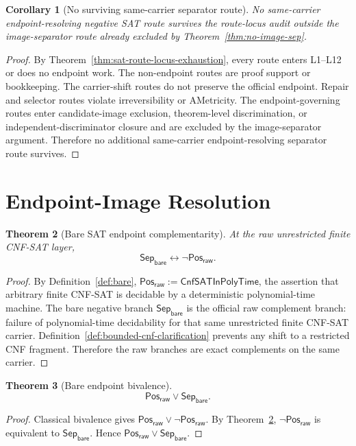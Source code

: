 \documentclass[11pt]{article}
\newtheorem{theorem}{Theorem}[section]
\newtheorem{corollary}[theorem]{Corollary}
\theoremstyle{definition}
\theoremstyle{remark}
\newcommand{\PosRaw}{\mathsf{Pos}_{\mathsf{raw}}}
\newcommand{\SepBare}{\mathsf{Sep}_{\mathsf{bare}}}
\newcommand{\CnfSATP}{\mathsf{CnfSATInPolyTime}}
\begin{document}
\begin{corollary}[No surviving same-carrier separator route]\label{cor:no-surviving-sat-separator-route}
No same-carrier endpoint-resolving negative SAT route survives the route-locus audit outside the image-separator route already excluded by Theorem~\ref{thm:no-image-sep}.
\end{corollary}

\begin{proof}
By Theorem~\ref{thm:sat-route-locus-exhaustion}, every route enters L1--L12 or does no endpoint work. The non-endpoint routes are proof support or bookkeeping. The carrier-shift routes do not preserve the official endpoint. Repair and selector routes violate irreversibility or AMetricity. The endpoint-governing routes enter candidate-image exclusion, theorem-level discrimination, or independent-discriminator closure and are excluded by the image-separator argument. Therefore no additional same-carrier endpoint-resolving separator route survives.
\end{proof}

\section{Endpoint-Image Resolution}\label{sec:final}

\begin{theorem}[Bare SAT endpoint complementarity]\label{thm:bare-complement}
At the raw unrestricted finite CNF-SAT layer,
\[
  \SepBare\leftrightarrow\neg\PosRaw.
\]
\end{theorem}

\begin{proof}
By Definition~\ref{def:bare}, \(\PosRaw:=\CnfSATP\), the assertion that arbitrary finite CNF-SAT is decidable by a deterministic polynomial-time machine. The bare negative branch \(\SepBare\) is the official raw complement branch: failure of polynomial-time decidability for that same unrestricted finite CNF-SAT carrier. Definition~\ref{def:bounded-cnf-clarification} prevents any shift to a restricted CNF fragment. Therefore the raw branches are exact complements on the same carrier.
\end{proof}

\begin{theorem}[Bare endpoint bivalence]\label{thm:bare-bivalence}
\[
  \PosRaw\vee\SepBare.
\]
\end{theorem}

\begin{proof}
Classical bivalence gives \(\PosRaw\vee\neg\PosRaw\). By Theorem~\ref{thm:bare-complement}, \(\neg\PosRaw\) is equivalent to \(\SepBare\). Hence \(\PosRaw\vee\SepBare\).
\end{proof}
\end{document}

